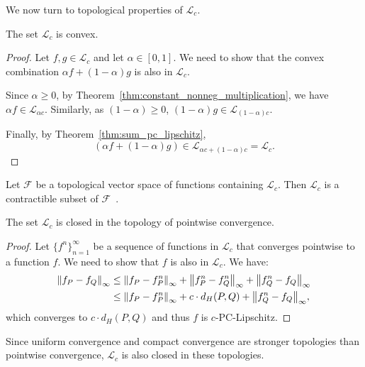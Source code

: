 We now turn to topological properties of $\mathcal{L}_c$.

\begin{theorem}
    The set $\mathcal{L}_c$ is convex.
\end{theorem}
\begin{proof}
    Let $f, g \in \mathcal{L}_c$ and let $\alpha \in [0, 1]$.
    We need to show that the convex combination $\alpha f + (1 - \alpha) g$ is
    also in $\mathcal{L}_c$.

    Since $\alpha \geq 0$, by Theorem~\ref{thm:constant_nonneg_multiplication},
    we have $\alpha f \in \mathcal{L}_{\alpha c}$.
    Similarly, as $(1 - \alpha) \geq 0$, $(1 - \alpha) g \in \mathcal{L}_{(1 - \alpha)c}$.

    Finally, by Theorem~\ref{thm:sum_pc_lipschitz},
    \begin{equation}
        (\alpha f + (1 - \alpha) g) \in \mathcal{L}_{\alpha c + (1 - \alpha)c} = \mathcal{L}_c.
    \end{equation}
\end{proof}

\begin{corollary}
    Let $\mathcal{F}$ be a topological vector space of functions containing
    $\mathcal{L}_c$. Then $\mathcal{L}_c$ is a contractible subset of
    $\mathcal{F}$~\cite{munkres2000topology}.
\end{corollary}
\begin{theorem}
    The set $\mathcal{L}_c$ is closed in the topology of pointwise convergence.
\end{theorem}
\begin{proof}
    Let $\{f^n\}_{n = 1}^\infty$ be a sequence of functions in $\mathcal{L}_c$
    that converges pointwise to a function $f$. We need to show that $f$
    is also in $\mathcal{L}_c$.
    We have:
    \begin{align}
        \norm{f_P - f_Q}_\infty & \leq \norm{f_P - f^n_P}_\infty + \norm{f^n_P - f^n_Q}_\infty + \norm{f^n_Q - f_Q}_\infty \\
        & \leq \norm{f_P - f^n_P}_\infty + c \cdot d_H(P, Q) + \norm{f^n_Q - f_Q}_\infty,
    \end{align}
    which converges to $c \cdot d_H(P, Q)$ and thus $f$ is $c$-PC-Lipschitz.    
\end{proof}
\begin{corollary}
    Since uniform convergence and compact convergence are stronger topologies
    than pointwise convergence, $\mathcal{L}_c$ is also closed in these topologies.
\end{corollary}

